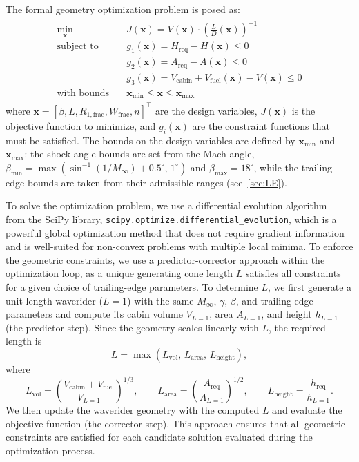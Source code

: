 \documentclass[10pt,a4paper]{article}
\begin{document}
The formal geometry optimization problem is posed as:
\begin{gather}
    \begin{aligned}
        \min_{\mathbf{x}} \quad & J(\mathbf{x}) = V(\mathbf{x})\cdot{\left(\frac{L}{D}(\mathbf{x})\right)}^{-1} \\
        \text{subject to} \quad & g_1(\mathbf{x}) = H_{\text{req}} - H(\mathbf{x}) \le 0 \\
        & g_2(\mathbf{x}) = A_{\text{req}} - A(\mathbf{x}) \le 0 \\
        & g_3(\mathbf{x}) = V_{\text{cabin}} + V_{\text{fuel}}(\mathbf{x}) - V(\mathbf{x}) \le 0 \\
        \text{with bounds} \quad & \mathbf{x}_\text{min} \le \mathbf{x} \le \mathbf{x}_\text{max}
    \end{aligned}
\end{gather}
where $\mathbf{x} = {[\beta, L, R_{1,\text{frac}}, W_{\text{frac}}, n]}^\top$ are the design variables, $J(\mathbf{x})$ is the objective function to minimize, and $g_i(\mathbf{x})$ are the constraint functions that must be satisfied. The bounds on the design variables are defined by $\mathbf{x}_\text{min}$ and $\mathbf{x}_\text{max}$: the shock-angle bounds are set from the Mach angle,\ $\beta_{\min} = \max\left(\sin^{-1}(1/M_\infty) + 0.5^{\circ},\,1^{\circ}\right)$ and $\beta_{\max} = 18^{\circ}$, while the trailing-edge bounds are taken from their admissible ranges (see~\cref{sec:LE}).

To solve the optimization problem, we use a differential evolution algorithm~\citep{Storn:1997} from the SciPy library, \texttt{scipy.optimize.differential\_evolution}, which is a powerful global optimization method that does not require gradient information and is well-suited for non-convex problems with multiple local minima. To enforce the geometric constraints, we use a predictor-corrector approach within the optimization loop, as a unique generating cone length $L$ satisfies all constraints for a given choice of trailing-edge parameters. To determine $L$, we first generate a unit-length waverider ($L=1$) with the same $M_\infty$, $\gamma$, $\beta$, and trailing-edge parameters and compute its cabin volume $V_{L=1}$, area $A_{L=1}$, and height $h_{L=1}$ (the predictor step). Since the geometry scales linearly with $L$, the required length is
\begin{equation}
    L = \max\left(L_{\mathrm{vol}},\,L_{\mathrm{area}},\,L_{\mathrm{height}}\right),
\end{equation}
where
\begin{equation}
    L_{\mathrm{vol}} = \left(\frac{V_{\text{cabin}} + V_{\text{fuel}}}{V_{L=1}}\right)^{1/3},\qquad
    L_{\mathrm{area}} = \left(\frac{A_{\text{req}}}{A_{L=1}}\right)^{1/2},\qquad
    L_{\mathrm{height}} = \frac{h_{\text{req}}}{h_{L=1}}.
\end{equation}
We then update the waverider geometry with the computed $L$ and evaluate the objective function (the corrector step). This approach ensures that all geometric constraints are satisfied for each candidate solution evaluated during the optimization process.
\end{document}
